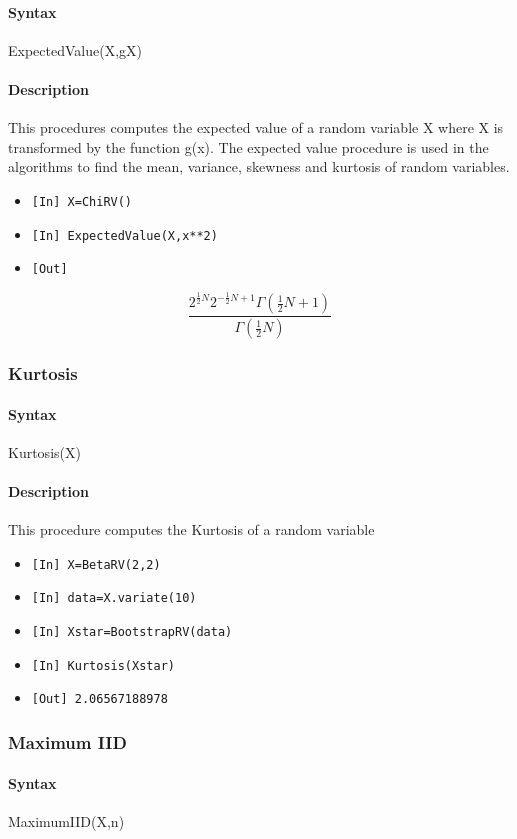 \documentclass[11pt,epsfig,psfig,doublespace,singlespace]{article}
\begin{document}
\paragraph{Syntax} ExpectedValue(X,gX)
\paragraph{Description} This procedures computes the expected value of a random variable X where X is transformed by the function g(x). The expected value procedure is used in the algorithms to find the mean, variance, skewness and kurtosis of random variables.
\begin{itemize}
\item \texttt{[In] X=ChiRV()}
\item \texttt{[In] ExpectedValue(X,x**2)}
\item \texttt{[Out]}
\end{itemize}
$$
\frac{2^{\frac{1}{2} N} 2^{- \frac{1}{2} N + 1} \Gamma\left(\frac{1}{2} N + 1\right)}{\Gamma\left(\frac{1}{2} N\right)}
$$
\subsubsection{Kurtosis}
\paragraph{Syntax} Kurtosis(X)
\paragraph{Description} This procedure computes the Kurtosis of a random variable
\begin{itemize}
\item \texttt{[In] X=BetaRV(2,2)}
\item \texttt{[In] data=X.variate(10)}
\item \texttt{[In] Xstar=BootstrapRV(data)}
\item \texttt{[In] Kurtosis(Xstar)}
\item \texttt{[Out] 2.06567188978}
\end{itemize}
\subsubsection{Maximum IID}
\paragraph{Syntax} MaximumIID(X,n)
\end{document}
